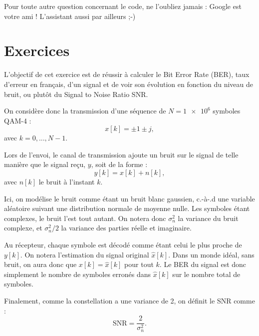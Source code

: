 \documentclass [a4paper, 11pt] {article}
\begin{document}
    Pour toute autre question concernant le code, ne l'oubliez jamais : Google est votre ami ! L'assistant aussi par ailleurs ;-)
    
    \pagebreak
    \pagestyle{nextpages}
    \part*{Exercices}
    
    \begin{exercice}{1}
    
        L'objectif de cet exercice est de réussir à calculer le Bit Error Rate (BER), taux d'erreur en français, d'un signal et de voir son évolution en fonction du niveau de bruit, ou plutôt du Signal to Noise Ratio SNR.
        
        On considère donc la transmission d'une séquence de $N=\num{1e6}$ symboles QAM-4 :
        \begin{equation}
            x[k] = \pm 1 \pm j,
        \end{equation}
        avec $k=0,...,N-1$.
        
        Lors de l'envoi, le canal de transmission ajoute un bruit sur le signal de telle manière que le signal reçu, $y$, soit de la forme :
        \begin{equation}
            y[k] = x[k] + n[k],
        \end{equation}
        avec $n[k]$ le bruit à l'instant $k$.
        
        Ici, on modélise le bruit comme étant un bruit blanc gaussien, c.-à-.d une variable aléatoire suivant une distribution normale de moyenne nulle. Les symboles étant complexes, le bruit l'est tout autant. On notera donc $\sigma_n^2$ la variance du bruit complexe, et $\sigma_n^2/2$ la variance des parties réelle et imaginaire.
        
        Au récepteur, chaque symbole est décodé comme étant celui le plus proche de $y[k]$. On notera l'estimation du signal original $\hat{x}[k]$. Dans un monde idéal, sans bruit, on aura donc que $x[k]=\hat{x}[k]$ pour tout $k$. Le BER du signal est donc simplement le nombre de symboles erronés dans $\hat{x}[k]$ sur le nombre total de symboles.
        
        Finalement, comme la constellation a une variance de 2, on définit le SNR comme :
        \begin{equation}
            \text{SNR} = \frac{2}{\sigma_n^2}.
        \end{equation}
        

\end{exercice}
\end{document}

